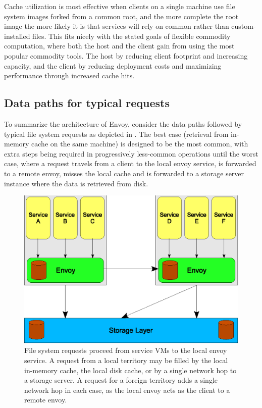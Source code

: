 Cache utilization is most effective when clients on a single machine use file system images forked from a common root, and the more complete the root image the more likely it is that services will rely on common rather than custom-installed files. This fits nicely with the stated goals of flexible commodity computation, where both the host and the client gain from using the most popular commodity tools. The host by reducing client footprint and increasing capacity, and the client by reducing deployment costs and maximizing performance through increased cache hits.

\subsection{Data paths for typical requests}

To summarize the architecture of Envoy, consider the data paths followed by typical file system requests as depicted in . The best case (retrieval from in-memory cache on the same machine) is designed to be the most common, with extra steps being required in progressively less-common operations until the worst case, where a request travels from a client to the local envoy service, is forwarded to a remote envoy, misses the local cache and is forwarded to a storage server instance where the data is retrieved from disk.

\begin{figure}[tp]
\centering
\includegraphics[width=.8\textwidth]{figures/hops}
\caption[Network paths taken by typical file requests]{File system requests proceed from service VMs to the local envoy service. A request from a local territory may be filled by the local in-memory cache, the local disk cache, or by a single network hop to a storage server. A request for a foreign territory adds a single network hop in each case, as the local envoy acts as the client to a remote envoy.}
\label{fig:hops}
\end{figure}

